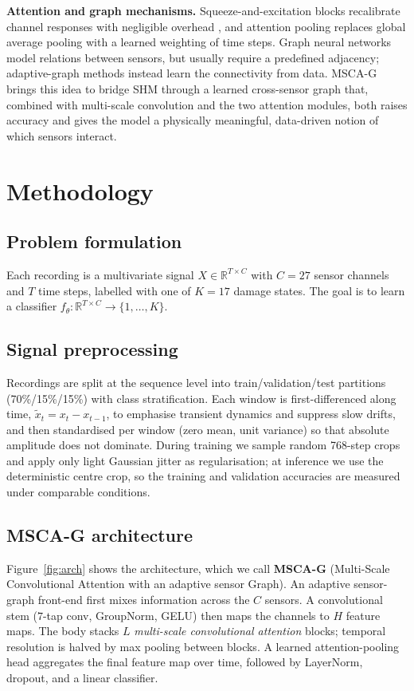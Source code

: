 \documentclass[11pt]{article}
\begin{document}
\textbf{Attention and graph mechanisms.} Squeeze-and-excitation blocks
recalibrate channel responses with negligible overhead \cite{hu2018squeeze}, and
attention pooling replaces global average pooling with a learned weighting of time
steps. Graph neural networks model relations between sensors, but usually require
a predefined adjacency; adaptive-graph methods instead learn the connectivity
from data. MSCA-G brings this idea to bridge SHM through a learned cross-sensor
graph that, combined with multi-scale convolution and the two attention modules,
both raises accuracy and gives the model a physically meaningful, data-driven
notion of which sensors interact.

\section{Methodology}
\label{sec:method}

\subsection{Problem formulation}
Each recording is a multivariate signal
$X \in \mathbb{R}^{T \times C}$ with $C=\num{27}$ sensor channels and $T$ time
steps, labelled with one of $K=\num{17}$ damage states. The goal is to learn a
classifier $f_\theta: \mathbb{R}^{T\times C}\!\to\!\{1,\dots,K\}$.

\subsection{Signal preprocessing}
\label{sec:preproc}
Recordings are split at the sequence level into train/validation/test partitions
(70\%/15\%/15\%) with class stratification. Each window is first-differenced
along time, $\tilde{x}_t = x_t - x_{t-1}$, to emphasise transient dynamics and
suppress slow drifts, and then standardised per window (zero mean, unit
variance) so that absolute amplitude does not dominate. During training we sample
random \num{768}-step crops and apply only light Gaussian jitter as
regularisation; at inference we use the deterministic centre crop, so the
training and validation accuracies are measured under comparable conditions.

\subsection{MSCA-G architecture}
\label{sec:arch}
Figure~\ref{fig:arch} shows the architecture, which we call \textbf{MSCA-G}
(Multi-Scale Convolutional Attention with an adaptive sensor Graph). An adaptive
sensor-graph front-end first mixes information across the $C$ sensors. A
convolutional stem ($7$-tap conv, GroupNorm, GELU) then maps the channels to $H$
feature maps. The body stacks $L$ \emph{multi-scale convolutional attention}
blocks; temporal resolution is halved by max pooling between blocks. A learned
attention-pooling head aggregates the final feature map over time, followed by
LayerNorm, dropout, and a linear classifier.
\end{document}
